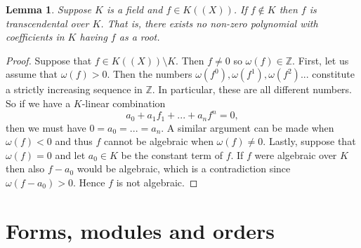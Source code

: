 \documentclass{article}
\newtheorem{lemma}{Lemma}[section]
\newcommand{\mbb}[1]{\mathbb{#1}}
\numberwithin{equation}{section}
\begin{document}
\begin{lemma}\label{lem: Unit power series is transcendental}
    Suppose $K$ is a field and $f \in K((X))$. If $f \notin K$ then $f$ is transcendental over $K$. That is, there exists no non-zero polynomial with coefficients in $K$ having $f$ as a root.
\end{lemma}
\begin{proof}
    Suppose that $f \in K((X)) \setminus K$. Then $f \neq 0$ so $\omega(f) \in \mbb Z$. First, let us assume that $\omega(f) > 0$. Then the numbers $\omega(f^0), \omega(f^1),\omega(f^2) ...$ constitute a strictly increasing sequence in $\mbb Z$. In particular, these are all different numbers. So if we have a $K$-linear combination
    $$a_0 + a_1 f_1 + ... + a_nf^n = 0,$$
    then we must have $0 = a_0 = ... = a_n$. A similar argument can be made when $\omega(f) < 0$ and thus $f$ cannot be algebraic when $\omega(f) \neq 0$. Lastly, suppose that $\omega(f) = 0$ and let $a_0 \in K$ be the constant term of $f$. If $f$ were algebraic over $K$ then also $f - a_0$ would be algebraic, which is a contradiction since $\omega(f - a_0) > 0$. Hence $f$ is not algebraic.
\end{proof}



\section{Forms, modules and orders}\label{sec: Forms and modules}
\end{document}
